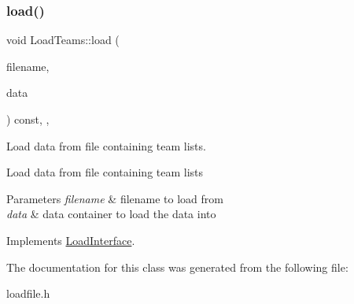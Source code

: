 \subsubsection{\texorpdfstring{load()}{load()}}
{\footnotesize\ttfamily void Load\+Teams\+::load (\begin{DoxyParamCaption}\item[{std\+::string}]{filename,  }\item[{\mbox{\hyperlink{classFileDataContainer}{File\+Data\+Container}} $\ast$}]{data }\end{DoxyParamCaption}) const\hspace{0.3cm}{\ttfamily [inline]}, {\ttfamily [override]}, {\ttfamily [virtual]}}



Load data from file containing team lists. 

Load data from file containing team lists 
\begin{DoxyParams}{Parameters}
{\em filename} & filename to load from \\
\hline
{\em data} & data container to load the data into \\
\hline
\end{DoxyParams}


Implements \mbox{\hyperlink{classLoadInterface_a91bdc01550e64219c4007afce054fd40}{Load\+Interface}}.



The documentation for this class was generated from the following file\+:\begin{DoxyCompactItemize}
\item 
loadfile.\+h\end{DoxyCompactItemize}

